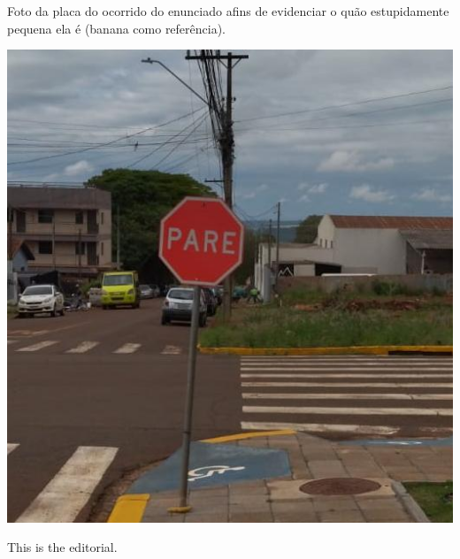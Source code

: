 Foto da placa do ocorrido do enunciado afins de evidenciar o quão estupidamente pequena ela é (banana como referência).

\includegraphics[scale=0.30]{placa.png}

This is the editorial.
